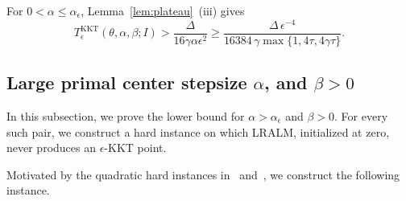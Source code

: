 For \(0<\alpha\le\alpha_\epsilon\), Lemma~\ref{lem:plateau}~(iii) gives
\[
T^{\mathrm{KKT}}_\epsilon(\theta,\alpha,\beta;I)
>\frac{\Delta}{16\gamma\alpha\epsilon^2}
\ge\frac{\Delta\,\epsilon^{-4}}{16384\,\gamma\max\{1,4\tau,4\gamma\tau\}}.
\]

\subsection{Large primal center stepsize \texorpdfstring{$\alpha$}{alpha}, and \texorpdfstring{$\beta>0$}{beta>0}}
\label{subsec:lb-rotation}

In this subsection, we prove the lower bound for
\(\alpha>\alpha_\epsilon\) and \(\beta>0\). For every such pair, we construct
a hard instance on which LRALM, initialized at zero, never produces an
\(\epsilon\)-KKT point.


Motivated by the quadratic hard instances in~\cite[Example~5.1]{li2026smoothing}
and~\cite[Appendix~C.1]{mahdavinia2022tight}, we construct the following instance.

